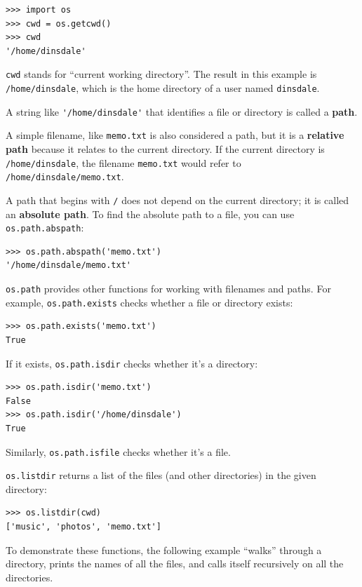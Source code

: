 \documentclass[10pt]{book}
\begin{document}
\begin{verbatim}
>>> import os
>>> cwd = os.getcwd()
>>> cwd
'/home/dinsdale'
\end{verbatim}
%
{\tt cwd} stands for ``current working directory''.  The result in
this example is {\tt /home/dinsdale}, which is the home directory of a
user named {\tt dinsdale}.

A string like \verb"'/home/dinsdale'" that identifies a file or
directory is called a {\bf path}.

A simple filename, like {\tt memo.txt} is also considered a path,
but it is a {\bf relative path} because it relates to the current
directory.  If the current directory is {\tt /home/dinsdale}, the
filename {\tt memo.txt} would refer to {\tt /home/dinsdale/memo.txt}.
 
 

A path that begins with {\tt /} does not depend on the current
directory; it is called an {\bf absolute path}.  To find the absolute
path to a file, you can use {\tt os.path.abspath}:

\begin{verbatim}
>>> os.path.abspath('memo.txt')
'/home/dinsdale/memo.txt'
\end{verbatim}
%
{\tt os.path} provides other functions for working with filenames
and paths.  For example,
{\tt os.path.exists} checks
whether a file or directory exists:

\begin{verbatim}
>>> os.path.exists('memo.txt')
True
\end{verbatim}
%
If it exists, {\tt os.path.isdir} checks whether it's a directory:

\begin{verbatim}
>>> os.path.isdir('memo.txt')
False
>>> os.path.isdir('/home/dinsdale')
True
\end{verbatim}
%
Similarly, {\tt os.path.isfile} checks whether it's a file.

{\tt os.listdir} returns a list of the files (and other directories)
in the given directory:

\begin{verbatim}
>>> os.listdir(cwd)
['music', 'photos', 'memo.txt']
\end{verbatim}
%
To demonstrate these functions, the following example
``walks'' through a directory, prints
the names of all the files, and calls itself recursively on
all the directories.
\end{document}
